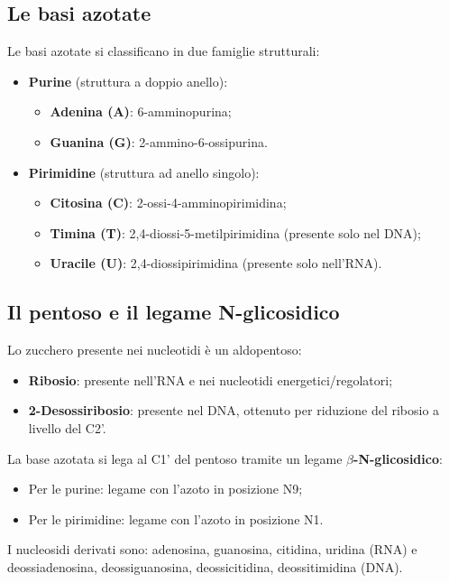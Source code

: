 \documentclass[12pt,a4paper]{report}
\begin{document}
\subsection{Le basi azotate}
Le basi azotate si classificano in due famiglie strutturali:
\begin{itemize}
\item \textbf{Purine} (struttura a doppio anello):
\begin{itemize}
    \item \textbf{Adenina (A)}: 6-amminopurina;
    \item \textbf{Guanina (G)}: 2-ammino-6-ossipurina.
\end{itemize}
\item \textbf{Pirimidine} (struttura ad anello singolo):
\begin{itemize}
    \item \textbf{Citosina (C)}: 2-ossi-4-amminopirimidina;
    \item \textbf{Timina (T)}: 2,4-diossi-5-metilpirimidina (presente solo nel DNA);
    \item \textbf{Uracile (U)}: 2,4-diossipirimidina (presente solo nell'RNA).
\end{itemize}
\end{itemize}
\subsection{Il pentoso e il legame N-glicosidico}
Lo zucchero presente nei nucleotidi è un aldopentoso:
\begin{itemize}
\item \textbf{Ribosio}: presente nell'RNA e nei nucleotidi energetici/regolatori;
\item \textbf{2-Desossiribosio}: presente nel DNA, ottenuto per riduzione del ribosio a livello del C2'.
\end{itemize}
La base azotata si lega al C1' del pentoso tramite un legame \textbf{$\beta$-N-glicosidico}:
\begin{itemize}
\item Per le purine: legame con l'azoto in posizione N9;
\item Per le pirimidine: legame con l'azoto in posizione N1.
\end{itemize}
I nucleosidi derivati sono: adenosina, guanosina, citidina, uridina (RNA) e deossiadenosina, deossiguanosina, deossicitidina, deossitimidina (DNA).
\end{document}
